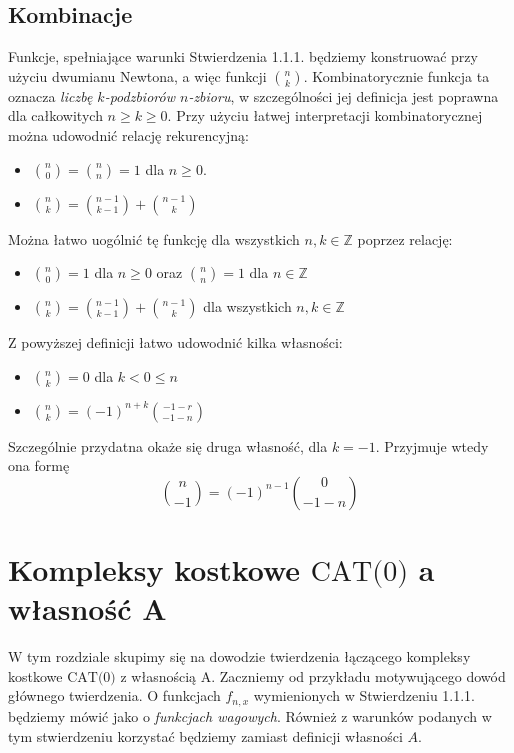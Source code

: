 \documentclass[licencjacka]{pracamgr}
\theoremstyle{definition}
\theoremstyle{definition}
\theoremstyle{definition}
\theoremstyle{definition}
\theoremstyle{definition}
\theoremstyle{plain}
\theoremstyle{plain}
\begin{document}
\section{Kombinacje}
Funkcje, spełniające warunki Stwierdzenia 1.1.1. będziemy konstruować przy 
użyciu dwumianu Newtona, a więc funkcji $ {n \choose k} $. Kombinatorycznie funkcja ta 
oznacza \textit{liczbę $ k $-podzbiorów $ n $-zbioru}, w szczególności jej definicja jest 
poprawna dla całkowitych $ n \geq k \geq 0 $. Przy użyciu łatwej interpretacji 
kombinatorycznej można udowodnić relację rekurencyjną:

\begin{itemize}
	\item $ {n \choose 0} = {n \choose n} = 1 $ dla $ n \geq 0 $.
	\item $ {n \choose k} = {n-1 \choose k-1} + {n-1 \choose k} $
\end{itemize}

Można łatwo uogólnić tę funkcję dla wszystkich $ n,k \in \mathbb{Z} $ poprzez relację:

\begin{itemize}
	\item $ {n \choose 0} = 1  $ dla $ n \geq 0$ oraz $ {n \choose n} = 1  $ dla 
	$ n \in \mathbb{Z}$
	\item $ {n \choose k} = {n -1 \choose k-1} + {n-1 \choose k} $ dla wszystkich $ n,k \in
	\mathbb{Z} $
\end{itemize}

Z powyższej definicji łatwo udowodnić kilka własności:

\begin{itemize}
	\item ${n \choose k} = 0$ dla $ k < 0 \leq n $
	\item $ {n \choose k} = (-1)^{n+k}{-1-r \choose -1-n} $
\end{itemize}

Szczególnie przydatna okaże się druga własność, dla $ k = -1 $. Przyjmuje wtedy ona formę 
$$ {n \choose -1} = (-1)^{n-1} {0 \choose -1-n} $$

\chapter{Kompleksy kostkowe $ \text{CAT(0)} $ a własność A}

W tym rozdziale skupimy się na dowodzie twierdzenia łączącego kompleksy kostkowe 
$ \text{CAT(0)} $ z własnością A. Zaczniemy od przykładu motywującego dowód głównego 
twierdzenia. O funkcjach $ f_{n,x} $ wymienionych w Stwierdzeniu 1.1.1. będziemy mówić jako o 
\textit{funkcjach wagowych}. Również z warunków podanych w tym stwierdzeniu korzystać 
będziemy zamiast definicji własności $A$.
\end{document}

